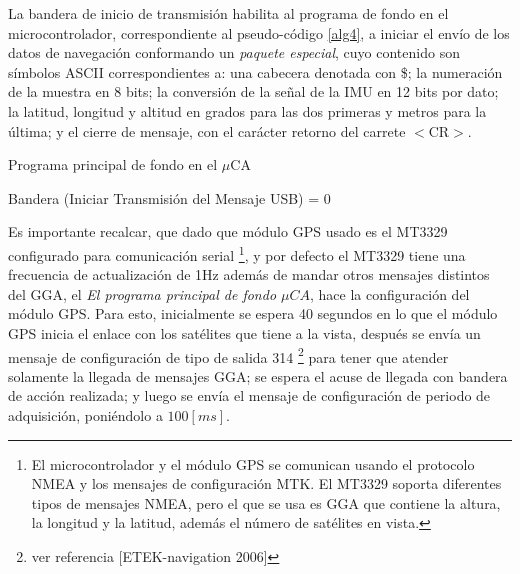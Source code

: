 \documentclass[10pt]{report}
\numberwithin{equation}{chapter}
\numberwithin{algorithm}{chapter}
\begin{document}
La bandera de inicio de transmisión habilita al programa de fondo en el microcontrolador, correspondiente al pseudo-código \ref{alg4}, a iniciar el envío de los datos de navegación conformando un \emph{paquete especial}, cuyo contenido son símbolos ASCII correspondientes a: una cabecera denotada con \$; la numeración de la muestra en 8 bits; la conversión de la señal de la IMU en 12 bits por dato; la latitud, longitud y altitud en grados para  las dos primeras y metros para la última; y el cierre de mensaje, con el carácter retorno del carrete $<$CR$>$.\par
\begin{algorithm}
\caption{Programa principal de fondo en el $\mu$CA}
\label{alg4}
\begin{algorithmic}\footnotesize
{}
 
\EndWhile
{}
\EndIf
\State Bandera (Iniciar Transmisión del Mensaje USB) = 0
\EndWhile
\end{algorithmic}
\end{algorithm}
Es importante recalcar, que dado que módulo GPS usado es el MT3329 configurado para comunicación serial \footnote{El microcontrolador y el módulo GPS se comunican usando el protocolo NMEA y los mensajes de configuración MTK. El MT3329 soporta diferentes tipos de mensajes NMEA, pero el que se usa es GGA que contiene la altura, la longitud y la latitud, además el número de satélites en vista.}, y por defecto el MT3329 tiene una frecuencia de actualización de 1Hz además de mandar otros mensajes distintos del GGA, el \emph{El programa principal de fondo $\mu CA$}, hace la configuración del módulo GPS. Para esto, inicialmente se espera 40 segundos en lo que el módulo GPS inicia el enlace con los satélites que tiene a la vista, después se envía un mensaje de configuración de tipo de salida 314 \footnote{ver referencia [ETEK-navigation 2006]} para tener que atender solamente la llegada de mensajes GGA; se espera el acuse de llegada con bandera de acción realizada; y luego se envía el mensaje de configuración de periodo de adquisición, poniéndolo a $100 [ms]$.\par
\end{document}
